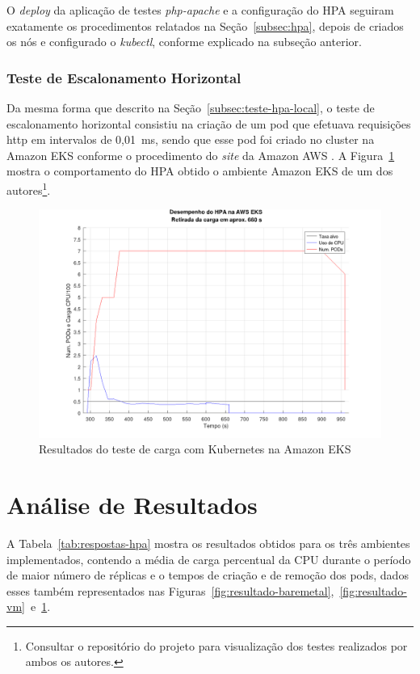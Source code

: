 \documentclass[12pt]{article}
\begin{document}
O \textit{deploy} da aplicação de testes \textit{php-apache} e a configuração do HPA seguiram exatamente os procedimentos relatados na Seção~\ref{subsec:hpa}, depois de criados os nós e configurado o \textit{kubectl}, conforme explicado na subseção anterior.

\subsubsection{Teste de Escalonamento Horizontal}

Da mesma forma que descrito na Seção~\ref{subsec:teste-hpa-local}, o teste de escalonamento horizontal consistiu na criação de um pod que efetuava requisições http em intervalos de 0,01~ms, sendo que esse pod foi criado no cluster na Amazon EKS conforme o procedimento do \textit{site} da Amazon AWS \cite{amazon_scale_nodate}. A Figura~\ref{fig:resultado-aws-eks} mostra o comportamento do HPA obtido o ambiente Amazon EKS de um dos autores\footnote{Consultar o repositório do projeto para visualização dos testes realizados por ambos os autores.}.

\begin{figure}[htbp]
\centering
\includegraphics[width=.9\textwidth]{aws_eks.png}
\caption{Resultados do teste de carga com Kubernetes na Amazon EKS}
\label{fig:resultado-aws-eks}
\end{figure}

\section{Análise de Resultados} \label{sec:analise-resultados}

A Tabela~\ref{tab:respostas-hpa} mostra os resultados obtidos para os três ambientes implementados, contendo a média de carga percentual da CPU durante o período de maior número de réplicas e o tempos de criação e de remoção dos pods, dados esses também representados nas Figuras~\ref{fig:resultado-baremetal},~\ref{fig:resultado-vm}~e~\ref{fig:resultado-aws-eks}.
\end{document}
